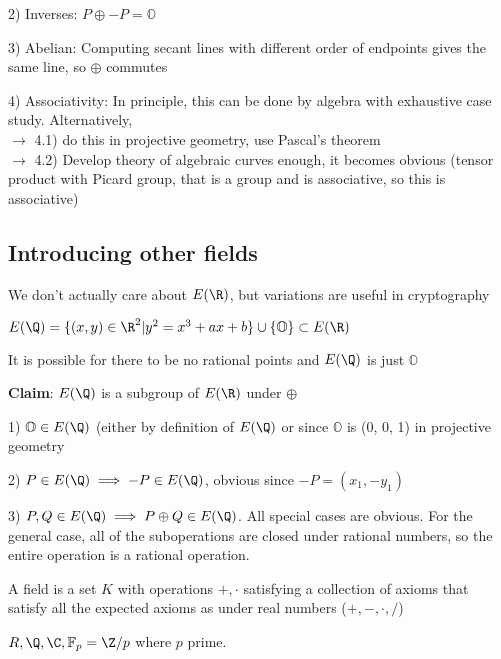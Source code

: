 \documentclass[10pt]{article}
\newcommand{\F}{\mathbb{F}}
\renewcommand{\O}{\mathbb{O}}
\begin{document}
2) Inverses: $P \oplus -P = \O$

3) Abelian: Computing secant lines with different order of endpoints gives the same line, so $\oplus$ commutes

4) Associativity: In principle, this can be done by algebra with exhaustive case study. Alternatively, \\
$\to$ 4.1) do this in projective geometry, use Pascal's theorem\\
$\to$ 4.2) Develop theory of algebraic curves enough, it becomes obvious (tensor product with Picard group, that is a group and is associative, so this is associative)

\subsection{Introducing other fields}
\begin{rmk}
    We don't actually care about $E(\R)$, but variations are useful in cryptography
\end{rmk}

\begin{defn}
    $E(\Q) = \{(x, y) \in \R^2 | y^2 = x^3 + ax + b\} \cup \{\O\} \subset E(\R)$
\end{defn}

\begin{rmk}
    It is possible for there to be no rational points and $E(\Q)$ is just $\O$
\end{rmk}

\textbf{Claim}: $E(\Q)$ is a subgroup of $E(\R)$ under $\oplus$

1) $\O \in E(\Q)$ (either by definition of $E(\Q)$ or since $\O$ is (0, 0, 1) in projective geometry

2) $P \in E(\Q) \implies -P \in E(\Q)$, obvious since $-P = (x_1, -y_1)$

3) $P, Q \in E(\Q) \implies P\oplus Q \in E(\Q)$. All special cases are obvious. For the general case, all of the suboperations are closed under rational numbers, so the entire operation is a rational operation.

\begin{rmk}
    A field is a set $K$ with operations $+, \cdot$ satisfying a collection of axioms that satisfy all the expected axioms as under real numbers ($+, -, \cdot, /$)
\end{rmk}

\begin{exm*}
    $R, \Q, \C, \F_p = \Z/p$ where $p$ prime.
\end{exm*}
\end{document}
